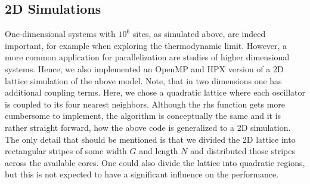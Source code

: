 \documentclass[10pt]{elsarticle}
\begin{document}
\subsection{2D Simulations}

One-dimensional systems with $10^6$ sites, as simulated above, are indeed important, for example when exploring the thermodynamic limit.
However, a more common application for parallelization are studies of higher dimensional systems.
Hence, we also implemented an OpenMP and HPX version of a 2D lattice simulation of the above model.
Note, that in two dimensions one has additional coupling terms.
Here, we chose a quadratic lattice where each oscillator is coupled to its four nearest neighbors.
Although the rhs function gets more cumbersome to implement, the algorithm is conceptually the same and it is rather straight forward, how the above code is generalized to a 2D simulation.
The only detail that should be mentioned is that we divided the 2D lattice into rectangular stripes of some width $G$ and length $N$ and distributed those stripes across the available cores.
One could also divide the lattice into quadratic regions, but this is not expected to have a significant influence on the performance.
\end{document}
